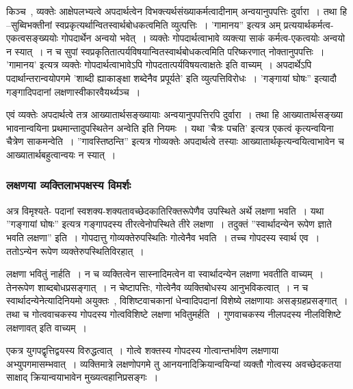 				किञ्च~, व्यक्तेः आक्षेपलभ्यत्वे अपदार्थत्वेन विभक्त्यर्थसंख्याकर्मत्वादीनाम् अन्वयानुपपत्तिः दुर्वारा~।  तथा हि –सुब्विभक्तीनां स्वप्रकृत्यर्थान्वितस्वार्थबोधकत्वमिति व्युत्पत्तिः~।  ’गामानय” इत्यत्र अम् प्रत्ययार्थकर्मत्व-एकत्वसङ्ख्ययोः गोपदार्थेन अन्वयो भवेत्~।  व्यक्तेः गोपदार्थत्वाभावे व्यक्त्या साकं कर्मत्व-एकत्वयोः अन्वयो न स्यात्~।  न च सुपां स्वप्रकृतितात्पर्यविषयान्वितस्वार्थबोधकत्वमिति परिष्करणात् नोक्तानुपपत्तिः~।  ’गामानय’ इत्यत्र व्यक्तेः गोपदार्थत्वाभावेऽपि गोपदतात्पर्यविषयत्वाक्षतेः इति वाच्यम्~। अपदार्थेऽपि पदार्थान्तरान्वयोपगमे ’शाब्दी ह्याकाङ्क्षा शब्देनैव प्रपूर्यते’ इति व्युत्पत्तिविरोधः~।  ’गङ्गायां घोषः” इत्यादौ गङ्गादिपदानां लक्षणास्वीकारवैयर्थ्यञ्च~। 

				एवं व्यक्तेः अपदार्थत्वे तत्र आख्यातार्थसङ्ख्यायाः अन्वयानुपपत्तिरपि दुर्वारा~।  तथा हि आख्यातार्थसङ्ख्या भावनान्वयिना प्रथमान्तादुपस्थितेन अन्वेति इति नियमः~।  यथा ’चैत्रः पचति’ इत्यत्र एकत्वं कृत्यन्वयिना चैत्रेण साकमन्वेति~।  ”गावस्तिष्ठन्ति” इत्यत्र गोव्यक्तेः अपदार्थत्वे तस्याः आख्यातार्थकृत्यन्वयित्वाभावेन च आख्यातार्थबहुत्वान्वयः न स्यात्~। 
			
			\subsubsection{लक्षणया व्यक्तिलाभपक्षस्य विमर्शः}
			
				अत्र विमृश्यते- पदानां स्वशक्य-शक्यतावच्छेदकातिरिक्तरूपेणैव उपस्थिते अर्थे लक्षणा भवति~।  यथा ”गङ्गायां घोषः” इत्यत्र गङ्गापदस्य तीरत्वेनोपस्थिते तीरे लक्षणा~।  तदुक्तं ”स्वार्थादन्येन रूपेण  ज्ञाते भवति लक्षणा” इति~।  गोपदात्तु गोव्यक्तेरुपस्थितिः गोत्वेनैव भवति~।  तच्च गोपदस्य स्वार्थ एव~। ततोऽन्येन  रूपेण व्यक्तेरुपस्थितिविरहात्~।

				लक्षणा भवितुं नार्हति~। न च व्यक्तित्वेन सास्नादिमत्वेन वा स्वार्थादन्येन लक्षणा भवतीति वाच्यम्~।  तेनरूपेण शाब्दबोधप्रसङ्गात्~।  न चेष्टापत्तिः, गोत्वेनैव व्यक्तिबोधस्य आनुभविकत्वात्~।  न च स्वार्थादन्येनेत्यादिनियमो अयुक्तः~, विशिष्टवाचकानां धेन्वादिपदानां विशेष्ये लक्षणायाः असङ्ग्रहप्रसङ्गात्~।  तथा च गोत्ववाचकस्य  गोपदस्य गोत्वविशिष्टे लक्षणा भवितुमर्हति~।  गुणवाचकस्य नीलपदस्य नीलविशिष्टे लक्षणावत् इति वाच्यम्~। 

				एकत्र युगपद्वृत्तिद्वयस्य विरुद्धत्वात्~।  गोत्वे शक्तस्य गोपदस्य गोत्वान्तर्भावेण लक्षणाया अभ्युपगमासम्भवात्~।  व्यक्तिमात्रे लक्षणोपगमे तु  आनयनादिक्रियान्वयिन्यां व्यक्तौ गोत्वस्य अवच्छेदकतया साक्षाद् क्रियान्वयाभावेन मुख्यत्वहानिप्रसङ्गः~। 


